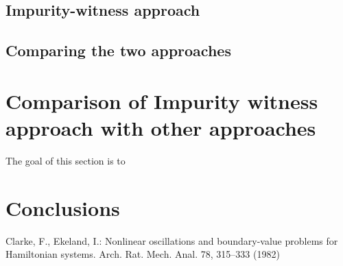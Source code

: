 \documentclass{llncs}
\begin{document}
\subsection{Impurity-witness approach}
\subsection{Comparing the two approaches}
\section{Comparison of Impurity witness approach with other approaches}
The goal of this section is to 

\section{Conclusions}
%

%
%
\begin{thebibliography}{5}
%
Clarke, F., Ekeland, I.:
Nonlinear oscillations and
boundary-value problems for Hamiltonian systems.
Arch. Rat. Mech. Anal. 78, 315--333 (1982)


\end{thebibliography}
\end{document}
